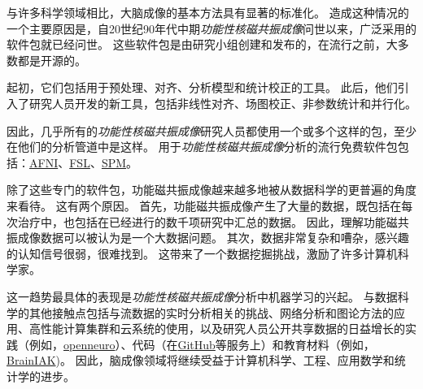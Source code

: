 \begin{proposition}[神经解剖学导航术语] \label{box:6_1}
	
	\quad \quad 与许多科学领域相比，大脑成像的基本方法具有显著的标准化。
	造成这种情况的一个主要原因是，自20世纪90年代中期\textit{功能性核磁共振成像}问世以来，广泛采用的软件包就已经问世。
	这些软件包是由研究小组创建和发布的，在流行之前，大多数都是开源的。
	
	\quad \quad 起初，它们包括用于预处理、对齐、分析模型和统计校正的工具。
	此后，他们引入了研究人员开发的新工具，包括非线性对齐、场图校正、非参数统计和并行化。
	
	\quad \quad 因此，几乎所有的\textit{功能性核磁共振成像}研究人员都使用一个或多个这样的包，至少在他们的分析管道中是这样。
	用于\textit{功能性核磁共振成像}分析的流行免费软件包包括：\href{https://afni.nimh.nih.gov}{AFNI}、\href{https://fsl.fmrib.ox.ac.uk}{FSL}、\href{https://www.fil.ion.ucl.ac.uk/spm}{SPM}。
	
	\quad \quad 除了这些专门的软件包，功能磁共振成像越来越多地被从数据科学的更普遍的角度来看待。
	这有两个原因。
	首先，功能磁共振成像产生了大量的数据，既包括在每次治疗中，也包括在已经进行的数千项研究中汇总的数据。
	因此，理解功能磁共振成像数据可以被认为是一个大数据问题。
	其次，数据非常复杂和嘈杂，感兴趣的认知信号很弱，很难找到。
	这带来了一个数据挖掘挑战，激励了许多计算机科学家。
	
	\quad \quad 这一趋势最具体的表现是\textit{功能性核磁共振成像}分析中机器学习的兴起。
	与数据科学的其他接触点包括与流数据的实时分析相关的挑战、网络分析和图论方法的应用、高性能计算集群和云系统的使用，以及研究人员公开共享数据的日益增长的实践（例如，\href{https://openneuro.org}{openneuro}）、代码（在\href{https://github.com/}{GitHub}等服务上）和教育材料（例如，\href{https://brainiak.org/tutorials}{BrainIAK})。
	因此，脑成像领域将继续受益于计算机科学、工程、应用数学和统计学的进步。
	
\end{proposition}



